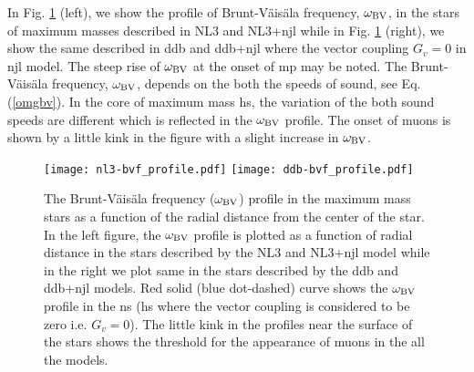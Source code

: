 \documentclass[a4paper, 11pt]{article}
\begin{document}
In Fig. \ref{figure:profile-bvf} (left), we show the profile of Brunt-V\"{a}is\"{a}la frequency, $\omega_{\rm BV}$, 
in the stars of maximum masses described in NL3 and NL3+\ac{njl} while in Fig. \ref{figure:profile-bvf} (right), we show the same described in \ac{ddb} and \ac{ddb}+\ac{njl} where the vector coupling $G_v=0$ in \ac{njl} model. The steep rise of $\omega_{\rm BV}$ at the onset of \ac{mp} may be noted. The Brunt-V\"{a}is\"{a}la frequency, $\omega_{\rm BV}$, depends on the both the speeds of sound, see Eq. (\ref{omgbv}). In the core of maximum mass \ac{hs}, the variation of the both sound speeds are different which is reflected in the $\omega_{\rm BV}$ profile. The onset of muons is shown by a little kink in the figure with a slight increase in $\omega_{\rm BV}$.

\begin{figure}
\centering
\texttt{[image: nl3-bvf\_profile.pdf]}
\texttt{[image: ddb-bvf\_profile.pdf]}
\caption{The Brunt-V\"ais\"ala frequency ($\omega_{\rm BV}$) profile in the maximum mass stars as a function of the radial distance from the center of the star. In the left figure, the $\omega_{\rm BV}$ profile is plotted as a function of radial distance in the stars described by the NL3 and NL3+\ac{njl} model while in the right we plot same in the stars described by the \ac{ddb} and \ac{ddb}+\ac{njl} models. Red solid (blue dot-dashed) curve shows the $\omega_{\rm BV}$ profile in the \ac{ns} (\ac{hs} where the vector coupling is considered to be zero i.e. $G_v=0$). The little kink in the profiles near the surface of the stars shows the threshold for the appearance of muons in the all the models.}
\label{figure:profile-bvf}
\end{figure}
\end{document}
